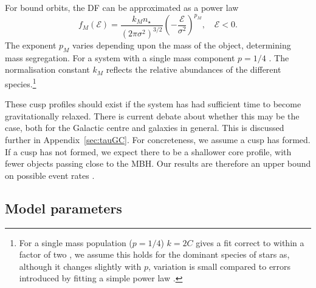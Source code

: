 \documentclass[useAMS,usedcolumn,usegraphicx,usenatbib]{mn2e}
\newcommand{\apref}[1]{Appendix~\ref{sec:#1}}
\begin{document}
For bound orbits, the DF can be approximated as a power law \citep{Peebles1972}
\begin{equation}
f_M(\mathcal{E}) = \frac{k_M n_\star}{(2\pi\sigma^2)^{3/2}}\left(-\frac{\mathcal{E}}{\sigma^2}\right)^{p_M},\quad\mathcal{E} < 0.
\label{eq:Bound_DF}
\end{equation}
The exponent $p_M$ varies depending upon the mass of the object, determining mass segregation. For a system with a single mass component $p = 1/4$ \citep{Bahcall1976, Young1977}. The normalisation constant $k_M$ reflects the relative abundances of the different species.\footnote{For a single mass population ($p = 1/4$) $k = 2 C$ gives a fit correct to within a factor of two \citep{Bahcall1976,Keshet2009}, we assume this holds for the dominant species of stars as, although it changes slightly with $p$, variation is small compared to errors introduced by fitting a simple power law \citep{Hopman2006, Alexander2009}.}

These cusp profiles should exist if the system has had sufficient time to become gravitationally relaxed. There is current debate about whether this may be the case, both for the Galactic centre and galaxies in general. This is discussed further in \apref{tauGC}. For concreteness, we assume a cusp has formed. If a cusp has not formed, we expect there to be a shallower core profile, with fewer objects passing close to the MBH. Our results are therefore an upper bound on possible event rates \citep{Merritt2010a,Gualandris2012}. 

\subsection{Model parameters}\label{sec:GC-Param}
\end{document}
